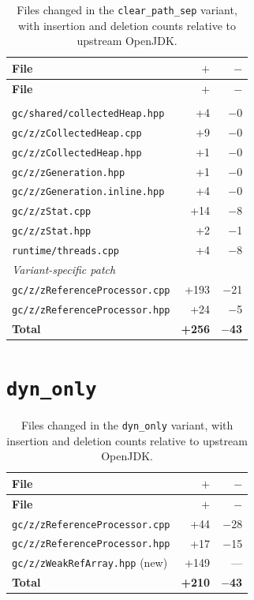\begin{longtable}[c]{lrr}
\caption[File changes in \texttt{clear\_path\_sep}]{Files changed in the \texttt{clear\_path\_sep} variant, with insertion and deletion counts relative to upstream OpenJDK.} \label{tab:patch-clear-path-sep} \\
\toprule
\textbf{File} & \textbf{$+$} & \textbf{$-$} \\
\midrule
\endfirsthead
\toprule
\textbf{File} & \textbf{$+$} & \textbf{$-$} \\
\midrule
\endhead
\bottomrule
\endfoot
\multicolumn{3}{l}{\textit{Base patch}} \\
\texttt{gc/shared/collectedHeap.hpp}     & +4  & $-$0 \\
\texttt{gc/z/zCollectedHeap.cpp}         & +9  & $-$0 \\
\texttt{gc/z/zCollectedHeap.hpp}         & +1  & $-$0 \\
\texttt{gc/z/zGeneration.hpp}            & +1  & $-$0 \\
\texttt{gc/z/zGeneration.inline.hpp}     & +4  & $-$0 \\
\texttt{gc/z/zStat.cpp}                  & +14 & $-$8 \\
\texttt{gc/z/zStat.hpp}                  & +2  & $-$1 \\
\texttt{runtime/threads.cpp}             & +4  & $-$8 \\
\multicolumn{3}{l}{\textit{Variant-specific patch}} \\
\texttt{gc/z/zReferenceProcessor.cpp}   & +193 & $-$21 \\
\texttt{gc/z/zReferenceProcessor.hpp}   & +24  & $-$5  \\
\midrule
\textbf{Total} & \textbf{+256} & \textbf{$-$43} \\
\end{longtable}

\section{\texttt{dyn\_only}}

\begin{longtable}[c]{lrr}
\caption[File changes in \texttt{dyn\_only}]{Files changed in the \texttt{dyn\_only} variant, with insertion and deletion counts relative to upstream OpenJDK.} \label{tab:patch-dyn-only} \\
\toprule
\textbf{File} & \textbf{$+$} & \textbf{$-$} \\
\midrule
\endfirsthead
\toprule
\textbf{File} & \textbf{$+$} & \textbf{$-$} \\
\midrule
\endhead
\bottomrule
\endfoot
\texttt{gc/z/zReferenceProcessor.cpp}   & +44  & $-$28 \\
\texttt{gc/z/zReferenceProcessor.hpp}   & +17  & $-$15 \\
\texttt{gc/z/zWeakRefArray.hpp} (new)   & +149 & --- \\
\midrule
\textbf{Total} & \textbf{+210} & \textbf{$-$43} \\
\end{longtable}

